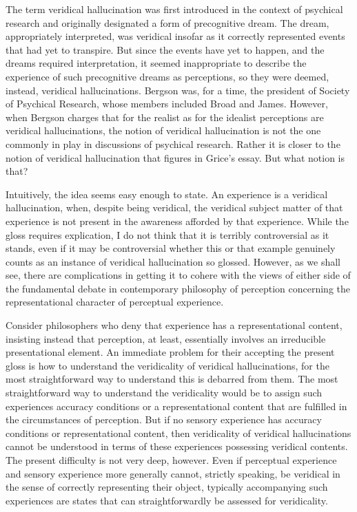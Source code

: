 \documentclass[12pt]{article}
\begin{document}
The term veridical hallucination was first introduced in the context of psychical research and originally designated a form of precognitive dream. The dream, appropriately interpreted, was veridical insofar as it correctly represented events that had yet to transpire. But since the events have yet to happen, and the dreams required interpretation, it seemed inappropriate to describe the experience of such precognitive dreams as perceptions, so they were deemed, instead, veridical hallucinations. Bergson was, for a time, the president of Society of Psychical Research, whose members included Broad and James. However, when Bergson charges that for the realist as for the idealist perceptions are veridical hallucinations, the notion of veridical hallucination is not the one commonly in play in discussions of psychical research. Rather it is closer to the notion of veridical hallucination that figures in Grice's \citeyearpar{Grice:1962jw} essay. But what notion is that?

Intuitively, the idea seems easy enough to state. An experience is a veridical hallucination, when, despite being veridical, the veridical subject matter of that experience is not present in the awareness afforded by that experience. While the gloss requires explication, I do not think that it is terribly controversial as it stands, even if it may be controversial whether this or that example genuinely counts as an instance of veridical hallucination so glossed. However, as we shall see, there are complications in getting it to cohere with the views of either side of the fundamental debate in contemporary philosophy of perception concerning the representational character of perceptual experience.

Consider philosophers who deny that experience has a representational content, insisting instead that perception, at least, essentially involves an irreducible presentational element. An immediate problem for their accepting the present gloss is how to understand the veridicality of veridical hallucinations, for the most straightforward way to understand this is debarred from them. The most straightforward way to understand the veridicality would be to assign such experiences accuracy conditions or a representational content that are fulfilled in the circumstances of perception. But if no sensory experience has accuracy conditions or representational content, then veridicality of veridical hallucinations cannot be understood in terms of these experiences possessing veridical contents. The present difficulty is not very deep, however. Even if perceptual experience and sensory experience more generally cannot, strictly speaking, be veridical in the sense of correctly representing their object, typically accompanying such experiences are states that can straightforwardly be assessed for veridicality. 
\end{document}
